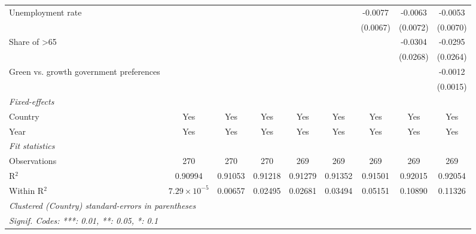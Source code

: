 \begin{table}[htbp]
\begin{tabular}{lcccccccc}
      Unemployment rate                                       &                       &          &          &          &          & -0.0077  & -0.0063  & -0.0053\\   
                                                              &                       &          &          &          &          & (0.0067) & (0.0072) & (0.0070)\\   
      Share of >65                                            &                       &          &          &          &          &          & -0.0304  & -0.0295\\   
                                                              &                       &          &          &          &          &          & (0.0268) & (0.0264)\\   
      Green vs. growth government preferences                 &                       &          &          &          &          &          &          & -0.0012\\   
                                                              &                       &          &          &          &          &          &          & (0.0015)\\   
      \midrule
      \emph{Fixed-effects}\\
      Country                                                 & Yes                   & Yes      & Yes      & Yes      & Yes      & Yes      & Yes      & Yes\\  
      Year                                                    & Yes                   & Yes      & Yes      & Yes      & Yes      & Yes      & Yes      & Yes\\  
      \midrule
      \emph{Fit statistics}\\
      Observations                                            & 270                   & 270      & 270      & 269      & 269      & 269      & 269      & 269\\  
      R$^2$                                                   & 0.90994               & 0.91053  & 0.91218  & 0.91279  & 0.91352  & 0.91501  & 0.92015  & 0.92054\\  
      Within R$^2$                                            & $7.29\times 10^{-5}$  & 0.00657  & 0.02495  & 0.02681  & 0.03494  & 0.05151  & 0.10890  & 0.11326\\  
      \midrule \midrule
      \multicolumn{9}{l}{\emph{Clustered (Country) standard-errors in parentheses}}\\
      \multicolumn{9}{l}{\emph{Signif. Codes: ***: 0.01, **: 0.05, *: 0.1}}\\
   \end{tabular}
\end{table}


